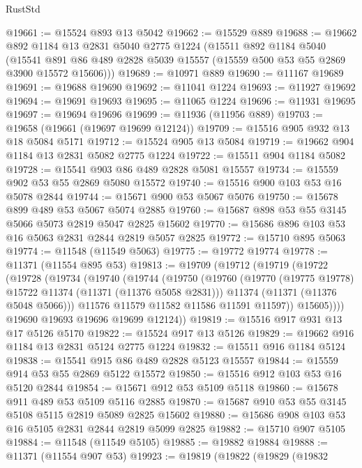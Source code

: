 \begin{lexlean}{RustStd}
\begin{coremodule}
@19661 := @15524 @893 @13 @5042
@19662 := @15529 @889
@19688 := @19662
    @892
    @1184
    @13
    @2831
    @5040
    @2775
    @1224
    (@15511
      @892
      @1184
      @5040
      (@15541 @891 @86 @489 @2828 @5039 @15557 (@15559 @500 @53 @55 @2869 @3900 @15572 @15606)))
@19689 := @10971 @889
@19690 := @11167 @19689
@19691 := @19688 @19690
@19692 := @11041 @1224
@19693 := @11927 @19692
@19694 := @19691 @19693
@19695 := @11065 @1224
@19696 := @11931 @19695
@19697 := @19694 @19696
@19699 := @11936 (@11956 @889)
@19703 := @19658 (@19661 (@19697 @19699 @12124))
@19709 := @15516 @905 @932 @13 @18 @5084 @5171
@19712 := @15524 @905 @13 @5084
@19719 := @19662 @904 @1184 @13 @2831 @5082 @2775 @1224
@19722 := @15511 @904 @1184 @5082
@19728 := @15541 @903 @86 @489 @2828 @5081 @15557
@19734 := @15559 @902 @53 @55 @2869 @5080 @15572
@19740 := @15516 @900 @103 @53 @16 @5078 @2844
@19744 := @15671 @900 @53 @5067 @5076
@19750 := @15678 @899 @489 @53 @5067 @5074 @2885
@19760 := @15687 @898 @53 @55 @3145 @5066 @5073 @2819 @5047 @2825 @15602
@19770 := @15686 @896 @103 @53 @16 @5063 @2831 @2844 @2819 @5057 @2825
@19772 := @15710 @895 @5063
@19774 := @11548 (@11549 @5063)
@19775 := @19772 @19774
@19778 := @11371 (@11554 @895 @53)
@19813 := @19709
    (@19712
      (@19719
        (@19722
          (@19728
            (@19734
              (@19740
                (@19744
                  (@19750
                    (@19760
                      (@19770 (@19775 @19778) @15722 @11374 (@11371 (@11376 @5058 @2831)))
                      @11374
                      (@11371 (@11376 @5048 @5066)))
                    @11576
                    @11579
                    @11582
                    @11586
                    @11591
                    @11597))
                @15605))))
        @19690
        @19693
        @19696
        @19699
        @12124))
@19819 := @15516 @917 @931 @13 @17 @5126 @5170
@19822 := @15524 @917 @13 @5126
@19829 := @19662 @916 @1184 @13 @2831 @5124 @2775 @1224
@19832 := @15511 @916 @1184 @5124
@19838 := @15541 @915 @86 @489 @2828 @5123 @15557
@19844 := @15559 @914 @53 @55 @2869 @5122 @15572
@19850 := @15516 @912 @103 @53 @16 @5120 @2844
@19854 := @15671 @912 @53 @5109 @5118
@19860 := @15678 @911 @489 @53 @5109 @5116 @2885
@19870 := @15687 @910 @53 @55 @3145 @5108 @5115 @2819 @5089 @2825 @15602
@19880 := @15686 @908 @103 @53 @16 @5105 @2831 @2844 @2819 @5099 @2825
@19882 := @15710 @907 @5105
@19884 := @11548 (@11549 @5105)
@19885 := @19882 @19884
@19888 := @11371 (@11554 @907 @53)
@19923 := @19819
    (@19822
      (@19829
        (@19832

\end{coremodule}
\end{lexlean}
